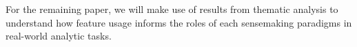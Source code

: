 \par For the remaining paper, we will make use of results from thematic analysis to understand how feature usage informs the roles of each sensemaking paradigms in real-world analytic tasks.
